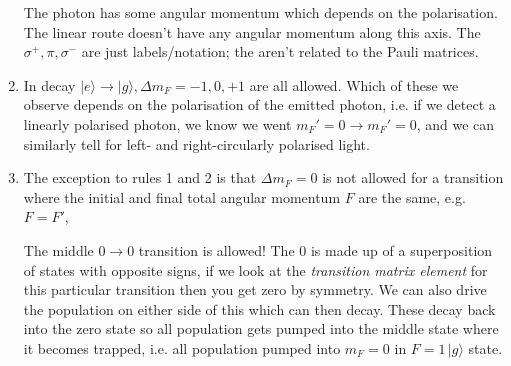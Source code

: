 \documentclass[lasers.tex]{subfiles}
\begin{document}
\begin{enumerate}
\begin{figure}[H]
        \end{figure}
        The photon has some angular momentum which depends on the polarisation. 
        The linear route doesn't have any angular momentum along this axis. 
        The $\sigma^+,\pi,\sigma^-$ are just labels/notation; the aren't related to the Pauli matrices. 
    \item In decay $|e\rangle\to|g\rangle,\Delta m_F=-1,0,+1$ are all allowed. 
        Which of these we observe depends on the polarisation of the emitted photon, i.e. if we detect a linearly polarised photon, we know we went $m_F'=0\to m_F'=0$, and we can similarly tell for left- and right-circularly polarised light. 
    \item The exception to rules 1 and 2 is that $\Delta m_F=0$ is not allowed for a transition where the initial and final total angular momentum $F$ are the same, e.g. $F=F'$,
        \begin{figure}[H]
            \centering
        \end{figure}
        The middle $0\to0$ transition is  allowed!
        The $0$ is made up of a superposition of states with opposite signs, if we look at the \emph{transition matrix element} for this particular transition then you get zero by symmetry. 
        We can also drive the population on either side of this which can then decay. 
        These  decay back into the zero state so all population gets pumped into the middle state where it becomes trapped, i.e. all population pumped into $m_F=0$ in $F=1\,|g\rangle$ state.
\end{enumerate}
\end{document}
